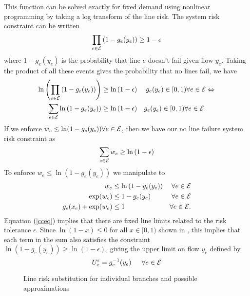 This function can be solved exactly for fixed demand using nonlinear programming by taking a log transform of the line risk.  The system risk constraint  can be written
\begin{equation*}  \prod_{e \in \mathcal{E}} \left( 1 - g_e(y_e) \right) \geq 1 - \epsilon
  \end{equation*}  
where $1 - g_e(y_e)$ is the probability that line $e$ doesn't fail given flow $y_e$.  Taking the product of all these events gives the probability that no lines fail, we have
\begin{align*}
  \ln \left( \prod_{e \in \mathcal{E}}\left( 1 - g_e(y_e)\right) \right) &\geq \ln \left(  1 - \epsilon \right)  & g_e(y_e) \in [0,1) \forall e  \in \mathcal{E} & \Leftrightarrow \\
  \sum_{e \in \mathcal{E}} \ln \left( 1-g_e(y_e) \right)  &\geq \ln \left( 1- \epsilon \right) & g_e(y_e) \in [0,1) \forall e  \in \mathcal{E}. &
\end{align*}
If we enforce $w_e \leq \ln (1-g_e(y_e)) \forall e \in \mathcal{E}$, then we have our no line failure system risk constraint  as
\begin{equation}\label{cceq}
\sum_{e \in \mathcal{E}} w_e  \geq \ln \left( 1-\epsilon \right)
\end{equation}
To enforce $w_e \leq \ln \left( 1 -g_e(y_e) \right)$ we manipulate to
\begin{align*}
w_e &\leq \ln \left( 1 - g_e(y_e)\right)  & \forall e \in \mathcal{E} \\
\exp(w_e) &\leq 1-g_e(y_e)  & \forall e \in \mathcal{E} \\
g_e(x_e) + \exp(w_e) &\leq 1  & \forall e \in \mathcal{E} .
\end{align*}
Equation (\ref{cceq}) implies that there are fixed line limits related to the risk tolerance $\epsilon$.  Since $\ln \left(1 - x \right) \leq 0 $  for all $x \in [0,1)$ shown in , this implies that each term in the sum also satisfies the constraint  $\ln \left(1-g_e(y_e)\right) \geq \ln \left( 1-\epsilon \right)$, giving the upper limit on flow $y_e$  defined by
\begin{equation}\label{hardlimit}
U_e^\epsilon = g_e^{-1}(y_e) \hspace{15px} \forall e \in \cE
\end{equation}


\begin{figure}
\begin{center} 

\end{center}
\caption{Line risk substitution for individual branches and possible approximations}\label{fig:linerisksub}
\end{figure}





